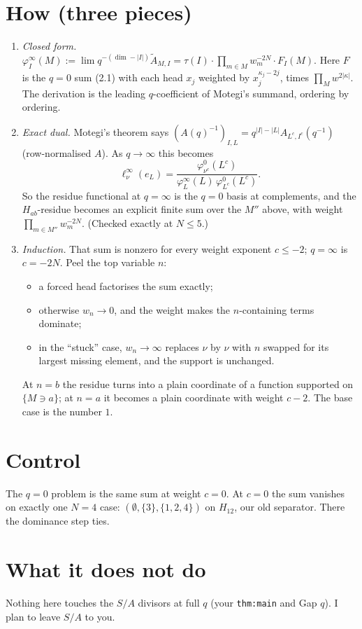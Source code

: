 \documentclass[10pt]{article}
\newcommand{\At}{\tilde A}
\begin{document}
\section*{How (three pieces)}
\begin{enumerate}
\item \emph{Closed form.} $\varphi^\infty_I(M):=\lim q^{-(\dim-|I|)}\At_{M,I}=\tau(I)\cdot\prod_{m\in M}w_m^{-2N}\cdot F_I(M)$. Here $F$ is the $q=0$ sum
(2.1) with each head $x_j$ weighted by $x_j^{\kappa_j-2j}$, times $\prod_M w^{2|\kappa|}$. The derivation is the leading
$q$-coefficient of Motegi's summand, ordering by ordering.
\item \emph{Exact dual.} Motegi's theorem says $(A(q)^{-1})_{I,L}=q^{|I|-|L|}A_{L^c,I^c}(q^{-1})$ (row-normalised $A$). As $q\to\infty$
this becomes
\[\ell^\infty_\nu(e_L)=\frac{\varphi^0_{\nu^c}(L^c)}{\varphi^\infty_L(L)\,\varphi^0_{L^c}(L^c)}.\]
So the residue functional at $q=\infty$ is the
$q=0$ basis at complements, and the $H_{ab}$-residue becomes an explicit finite sum over the $M''$ above, with weight
$\prod_{m\in M''}w_m^{-2N}$. (Checked exactly at $N\le5$.)
\item \emph{Induction.} That sum is nonzero for every weight exponent $c\le-2$; $q=\infty$ is $c=-2N$. Peel the top variable $n$:
\begin{itemize}
\item a forced head factorises the sum exactly;
\item otherwise $w_n\to0$, and the weight makes the $n$-containing terms dominate;
\item in the ``stuck'' case, $w_n\to\infty$ replaces $\nu$ by $\nu$ with $n$ swapped for its largest missing element, and the
support is unchanged.
\end{itemize}
At $n=b$ the residue turns into a plain coordinate of a function supported on $\{M\ni a\}$; at $n=a$ it becomes a
plain coordinate with weight $c-2$. The base case is the number $1$.
\end{enumerate}

\section*{Control}
The $q=0$ problem is the same sum at weight $c=0$. At $c=0$ the sum vanishes on exactly one $N=4$
case: $(\emptyset,\{3\},\{1,2,4\})$ on $H_{12}$, our old separator. There the dominance step ties.

\section*{What it does not do}
Nothing here touches the $S/A$ divisors at full $q$ (your \texttt{thm:main} and Gap $q$). I plan to leave $S/A$ to you.
\end{document}

